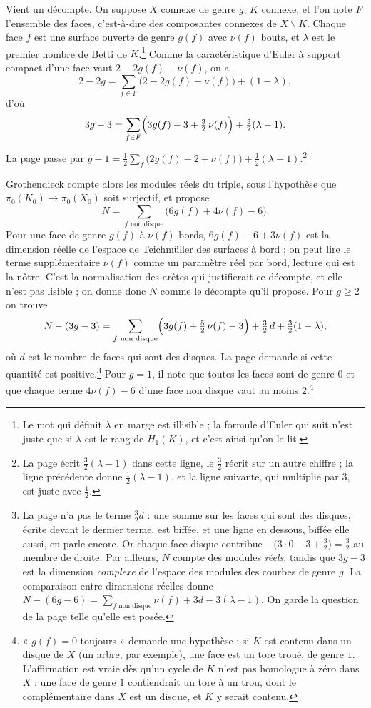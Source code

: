 \documentclass[11pt,a4paper]{article}
\begin{document}
Vient un décompte. On suppose $X$ connexe de genre $g$, $K$ connexe, et l'on
note $F$ l'ensemble des faces, c'est-à-dire des composantes connexes de
$X \smallsetminus K$. Chaque face $f$ est une surface ouverte de genre $g(f)$
avec $\nu(f)$ bouts, et $\lambda$ est le premier nombre de Betti de
$K$.\footnote{Le mot qui définit $\lambda$ en marge est illisible ; la
formule d'Euler qui suit n'est juste que si $\lambda$ est le rang de
$H_1(K)$, et c'est ainsi qu'on le lit.} Comme la caractéristique d'Euler à
support compact d'une face vaut $2 - 2g(f) - \nu(f)$, on a
\[
2 - 2g = \sum_{f \in F}\bigl(2 - 2g(f) - \nu(f)\bigr) + (1 - \lambda),
\]
d'où
\[
3g - 3 = \sum_{f \in F}\Bigl(3g(f) - 3 + \tfrac{3}{2}\,\nu(f)\Bigr)
+ \tfrac{3}{2}(\lambda - 1).
\]
La page passe par $g - 1 = \frac12\sum_f\bigl(2g(f)-2+\nu(f)\bigr) +
\frac12(\lambda-1)$.\footnote{La page écrit $\frac32(\lambda-1)$ dans cette
ligne, le $\frac32$ récrit sur un autre chiffre ; la ligne précédente donne
$\frac12(\lambda-1)$, et la ligne suivante, qui multiplie par $3$, est juste
avec $\frac12$.}

Grothendieck compte alors les modules réels du triple, sous l'hypothèse que
$\pi_0(K_0) \to \pi_0(X_0)$ soit surjectif, et propose
\[
N = \sum_{f \text{ non disque}} \bigl(6g(f) + 4\nu(f) - 6\bigr).
\]
Pour une face de genre $g(f)$ à $\nu(f)$ bords, $6g(f) - 6 + 3\nu(f)$ est la
dimension réelle de l'espace de Teichmüller des surfaces à bord ; on peut lire
le terme supplémentaire $\nu(f)$ comme un paramètre réel par bord, lecture qui
est la nôtre. C'est la
normalisation des arêtes qui justifierait ce décompte, et elle n'est pas
lisible ; on donne donc $N$ comme le décompte qu'il propose. Pour $g
\geqslant 2$ on trouve
\[
N - (3g - 3) = \sum_{f \text{ non disque}}\Bigl(3g(f) + \tfrac52\,\nu(f) -
3\Bigr) + \tfrac32\, d + \tfrac32(1 - \lambda),
\]
où $d$ est le nombre de faces qui sont des disques. La page demande si cette
quantité est positive.\footnote{La page n'a pas le terme $\frac32 d$ : une
somme sur les faces qui sont des disques, écrite devant le dernier terme, est
biffée, et une ligne en dessous, biffée elle aussi, en parle encore. Or chaque
face disque contribue $-\bigl(3\cdot 0 - 3 + \frac32\bigr) = \frac32$ au
membre de droite. Par ailleurs, $N$ compte des modules \emph{réels}, tandis
que $3g - 3$ est la dimension \emph{complexe} de l'espace des modules des
courbes de genre $g$. La comparaison entre dimensions réelles donne
$N - (6g - 6) = \sum_{f \text{ non disque}}\nu(f) + 3d - 3(\lambda - 1)$.
On garde la question de la page telle qu'elle est posée.} Pour $g = 1$, il
note que toutes les faces sont de genre $0$ et que chaque terme $4\nu(f) - 6$
d'une face non disque vaut au moins $2$.\footnote{« $g(f) = 0$ toujours »
demande une hypothèse : si $K$ est contenu dans un disque de $X$ (un arbre,
par exemple), une face est un tore troué, de genre $1$. L'affirmation est
vraie dès qu'un cycle de $K$ n'est pas homologue à zéro dans $X$ : une face de
genre $1$ contiendrait un tore à un trou, dont le complémentaire dans $X$ est
un disque, et $K$ y serait contenu.}
\end{document}
